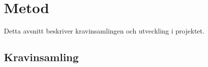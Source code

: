 \documentclass{article}
\begin{document}
\section{Metod}


Detta avsnitt beskriver kravinsamlingen och utveckling i projektet.
\subsection{Kravinsamling}

\end{document}
